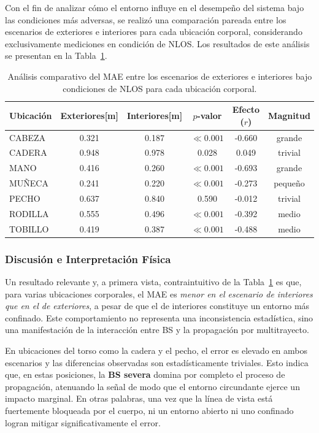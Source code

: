 Con el fin de analizar cómo el entorno influye en el desempeño del sistema bajo las condiciones más adversas, se realizó una comparación pareada entre los escenarios de exteriores e interiores para cada ubicación corporal, considerando exclusivamente mediciones en condición de NLOS. Los resultados de este análisis se presentan en la Tabla~\ref{tab:nlos_escenario}.
%
\begin{table}[t]
\centering
\caption{Análisis comparativo del MAE entre los escenarios de exteriores e interiores bajo condiciones de NLOS para cada ubicación corporal.}
\label{tab:nlos_escenario}
\begin{tabular}{lccccc}
\toprule
\rowcolor{headerblue}
\textbf{Ubicación} & \textbf{Exteriores[m]} & \textbf{Interiores[m]} & \textbf{$p$-valor} & \textbf{Efecto ($r$)} & \textbf{Magnitud} \\
\midrule
CABEZA  & 0.321 & 0.187 & $\ll 0.001$ & -0.660 & grande  \\
CADERA  & 0.948 & 0.978 & 0.028       &  0.049 & trivial \\
MANO    & 0.416 & 0.260 & $\ll 0.001$ & -0.693 & grande  \\
MUÑECA  & 0.241 & 0.220 & $\ll 0.001$ & -0.273 & pequeño \\
PECHO   & 0.637 & 0.840 & 0.590       & -0.012 & trivial \\
RODILLA & 0.555 & 0.496 & $\ll 0.001$ & -0.392 & medio   \\
TOBILLO & 0.419 & 0.387 & $\ll 0.001$ & -0.488 & medio   \\
\bottomrule
\end{tabular}
\end{table}

\subsubsection{Discusión e Interpretación Física}

Un resultado relevante y, a primera vista, contraintuitivo de la Tabla~\ref{tab:nlos_escenario} es que, para varias ubicaciones corporales, el MAE es \emph{menor en el escenario de interiores que en el de exteriores}, a pesar de que el de interiores constituye un entorno más confinado. Este comportamiento no representa una inconsistencia estadística, sino una manifestación de la interacción entre BS y la propagación por multitrayecto.

En ubicaciones del torso como la cadera y el pecho, el error es elevado en ambos escenarios y las diferencias observadas son estadísticamente triviales. Esto indica que, en estas posiciones, la \textbf{BS severa} domina por completo el proceso de propagación, atenuando la señal de modo que el entorno circundante ejerce un impacto marginal. En otras palabras, una vez que la línea de vista está fuertemente bloqueada por el cuerpo, ni un entorno abierto ni uno confinado logran mitigar significativamente el error.


